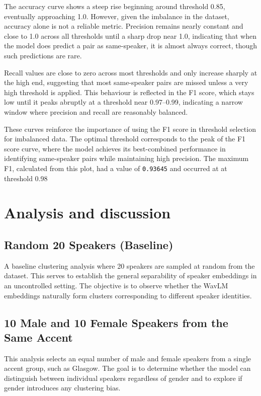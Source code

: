 \documentclass[conference]{IEEEtran}
\begin{document}
The accuracy curve shows a steep rise beginning around threshold 0.85, eventually approaching 1.0. However, given the imbalance in the dataset, accuracy alone is not a reliable metric. Precision remains nearly constant and close to 1.0 across all thresholds until a sharp drop near 1.0, indicating that when the model does predict a pair as same-speaker, it is almost always correct, though such predictions are rare.

Recall values are close to zero across most thresholds and only increase sharply at the high end, suggesting that most same-speaker pairs are missed unless a very high threshold is applied. This behaviour is reflected in the F1 score, which stays low until it peaks abruptly at a threshold near 0.97–0.99, indicating a narrow window where precision and recall are reasonably balanced.

These curves reinforce the importance of using the F1 score in threshold selection for imbalanced data. The optimal threshold corresponds to the peak of the F1 score curve, where the model achieves its best-combined performance in identifying same-speaker pairs while maintaining high precision. The maximum F1, calculated from this plot, had a value of \texttt{0.93645} and occurred at at threshold 0.98



\section{Analysis and discussion}



\subsection{Random 20 Speakers (Baseline)}
A baseline clustering analysis where 20 speakers are sampled at random from the dataset. This serves to establish the general separability of speaker embeddings in an uncontrolled setting. The objective is to observe whether the WavLM embeddings naturally form clusters corresponding to different speaker identities.

\subsection{10 Male and 10 Female Speakers from the Same Accent}
This analysis selects an equal number of male and female speakers from a single accent group, such as Glasgow. The goal is to determine whether the model can distinguish between individual speakers regardless of gender and to explore if gender introduces any clustering bias.
\end{document}
